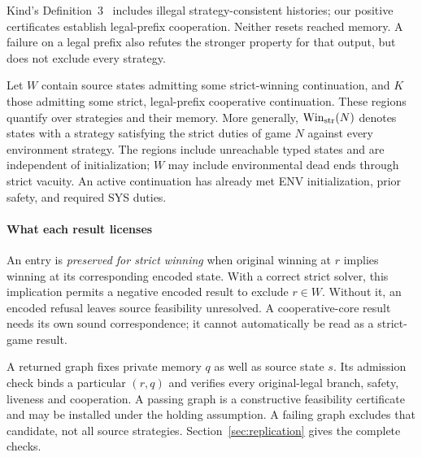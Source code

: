 Kind's Definition~3~\cite{kind} includes illegal strategy-consistent
histories; our positive certificates establish legal-prefix cooperation.
Neither resets reached memory. A failure on a legal prefix also refutes
the stronger property for that output, but does not exclude every strategy.

Let $W$ contain source states admitting some strict-winning continuation,
and $K$ those admitting some strict, legal-prefix cooperative continuation. These regions quantify over
strategies and their memory. More generally, $\operatorname{Win}_{\rm str}(N)$
denotes states with a strategy satisfying the strict duties of game $N$
against every environment strategy. The regions include unreachable typed states and
are independent of initialization; $W$ may include environmental dead
ends through strict vacuity. An active continuation has already met ENV
initialization, prior safety, and required SYS duties.

\paragraph{What each result licenses}
An entry is \emph{preserved for strict winning} when original winning at
$r$ implies winning at its corresponding encoded state. With a correct
strict solver, this implication permits a negative encoded result to
exclude $r\in W$. Without it, an encoded refusal leaves source feasibility
unresolved. A cooperative-core result needs its own sound correspondence;
it cannot automatically be read as a strict-game result.

A returned graph fixes private memory $q$ as well as source state $s$.
Its admission check binds a particular $(r,q)$ and verifies every
original-legal branch, safety, liveness and cooperation. A passing graph
is a constructive feasibility certificate and may be installed under the
holding assumption. A failing graph excludes that candidate, not all
source strategies. Section~\ref{sec:replication} gives the complete checks.

